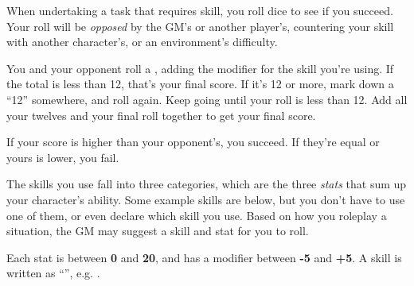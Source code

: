 
When undertaking a task that requires skill, you roll dice to see if you succeed. Your roll will be \emph{opposed} by the GM's or another player's, countering your skill with another character's, or an environment's difficulty.

You and your opponent roll a , adding the modifier for the skill you're using. If the total is less than 12, that's your final score. If it's 12 or more, mark down a ``12'' somewhere, and roll again. Keep going until your roll is less than 12. Add all your twelves and your final roll together to get your final score.

If your score is higher than your opponent's, you succeed. If they're equal or yours is lower, you fail.

The skills you use fall into three categories, which are the three \emph{stats} that sum up your character's ability. Some example skills are below, but you don't have to use one of them, or even declare which skill you use. Based on how you roleplay a situation, the GM may suggest a skill and stat for you to roll.



Each stat is between \textbf{0} and \textbf{20}, and has a modifier between \textbf{-5} and \textbf{+5}. A skill is written as ``'', e.g. .
